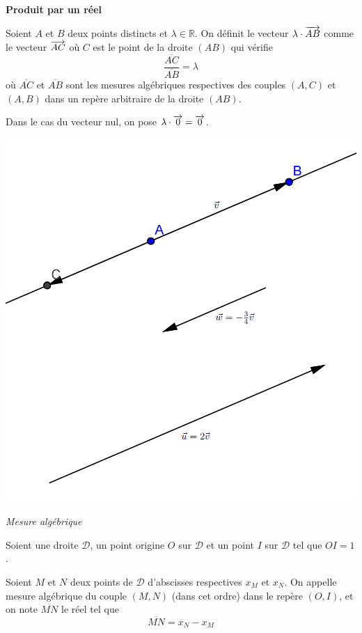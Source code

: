 \documentclass[10pt,oneside]{article}
\begin{document}
\begin{minipage}[c]{.7\linewidth}
\begin{propo}
\textbf{Produit par un réel}

Soient $A$ et $B$ deux points distincts et $\lambda\in \mathbb{R}$. On définit le vecteur $\lambda\cdot \overrightarrow{AB}$ comme le vecteur $\overrightarrow{AC}$ où $C$ est le point de la droite $(AB)$ qui vérifie 
$$
\dfrac{\overline{AC}}{\overline{AB}} = \lambda
$$
 où $\overline{AC}$ et $\overline{AB}$ sont les mesures algébriques respectives des couples $(A,C)$ et $(A,B)$ dans un repère arbitraire de la droite $(AB)$.

Dans le cas du vecteur nul, on pose $\lambda \cdot \overrightarrow{0} =\overrightarrow{0}$.
\end{propo}
\end{minipage}\hfill
\begin{minipage}[c]{.28\linewidth}
\begin{center}
\includegraphics[width=.95\textwidth]{png/produit_vecteur}
\end{center}
\end{minipage}



\begin{rem}
\textit{Mesure algébrique}


Soient une droite $\mathcal{D}$, un point origine $O$ sur $\mathcal{D}$ et un point $I$ sur $\mathcal{D}$ tel que $OI=1$. 

Soient $M$ et $N$ deux points de $\mathcal{D}$ d'abscisses respectives $x_M$ et $x_N$. On appelle mesure algébrique du couple $(M,N)$ (dans cet ordre) dans le repère $(O,I)$, et on note $\overline{MN}$ le réel tel que 
$$
\overline{MN} = x_N - x_M
$$
\end{rem}
\end{document}
